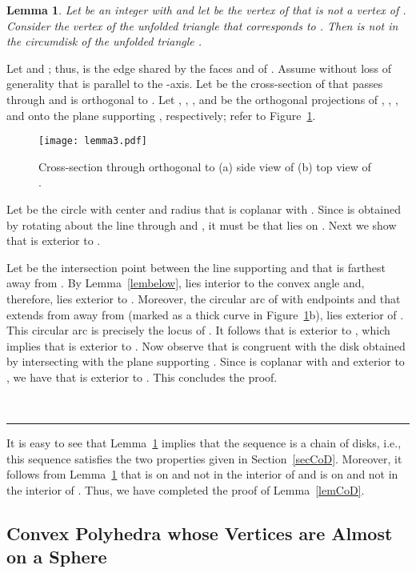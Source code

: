 \documentclass[12pt]{article}
\newtheorem{lemma}{Lemma}
\newcommand{\qed}{\rule{0.5em}{1.5ex}}
\newcommand{\fqed}{{\hfill~\qed}}
\newenvironment{proof}{{\noindent \bf Proof.}}
                      {{\hfill \fqed} \vspace{1em}}
\begin{document}
\begin{lemma}   \label{lemlocallyD} 
Let  be an integer with  and let  be the vertex of 
 that is not a vertex of . Consider the vertex  of the 
unfolded triangle  that corresponds to . Then  is not in 
the circumdisk  of the unfolded triangle .  
\end{lemma} 
\begin{proof}  
Let  and ; thus,  is 
the edge shared by the faces  and  of . Assume without 
loss of generality that  is parallel to the -axis. Let  be 
the cross-section of  that passes through  and is orthogonal 
to . Let , , , and  be the orthogonal projections 
of , , , and  onto the plane supporting , respectively; 
refer to Figure~\ref{fig:lem3}.

\begin{figure}
\centering
\texttt{[image: lemma3.pdf]}
\caption{Cross-section through  orthogonal to  (a) side view 
of  (b) top view of . }
\label{fig:lem3}
\end{figure}


Let  be the circle with center  and radius  that is 
coplanar with . Since  is obtained by rotating  
about the line through  and , it must be that  lies on 
. Next we show that  is exterior to .

Let  be the intersection point between the line supporting  
and  that is farthest away from . By Lemma~\ref{lembelow}, 
 lies interior to the convex angle  and, therefore, 
 lies exterior to . Moreover, the circular arc of  
with endpoints  and  that extends from  away from  
(marked as a thick curve in Figure~\ref{fig:lem3}b), lies exterior of 
. This circular arc is precisely the locus of . It follows that 
 is exterior to , which implies that  is exterior to 
. Now observe that  is congruent with the disk  
obtained by intersecting  with the plane supporting . 
Since  is coplanar with  and exterior to , we have 
that  is exterior to . This concludes the proof.
\end{proof} 

It is easy to see that Lemma~\ref{lemlocallyD} implies that the sequence 
 is a chain of disks, i.e., this sequence satisfies the 
two properties given in Section~\ref{secCoD}. Moreover, it follows from 
Lemma~\ref{lemlocallyD} that  is on  and not in the 
interior of  and  is on  and not in the interior 
of . Thus, we have completed the proof of Lemma~\ref{lemCoD}.    


\subsection{Convex Polyhedra whose Vertices are Almost on a Sphere}  
\label{secalmost} 
\end{document}
